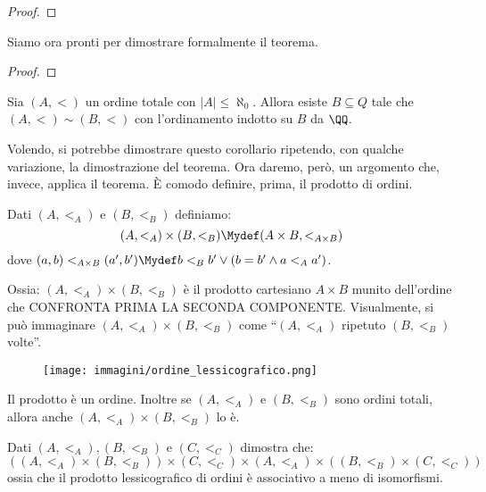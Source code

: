 \documentclass[11pt]{scrartcl}
\begin{document}
\begin{proof}
	
\end{proof}

Siamo ora pronti per dimostrare formalmente il teorema.

\begin{proof}
	
\end{proof}

\begin{corollary}
	Sia $(A,<)$ un ordine totale con $|A| \leq \aleph_0$. Allora esiste $B \subseteq Q$ tale che $(A,<) \sim (B,<)$ con l'ordinamento indotto su $B$ da $\QQ$.
\end{corollary}

\begin{note}
	Volendo, si potrebbe dimostrare questo corollario ripetendo, con qualche variazione, la dimostrazione del teorema. Ora daremo, però,
	un argomento che, invece, applica il teorema. È comodo definire, prima, il prodotto di ordini.
\end{note}

\begin{definition}
	Dati $(A,<_A)$ e $(B,<_B)$ definiamo:
	\[ (A,<_A) \times (B,<_B) \Mydef (A \times B, <_{A \times B})
 		\]
	dove $(a,b) <_{A \times B} (a',b') \Mydef b <_B b' \lor (b = b' \land a <_A a')$.
\end{definition}

Ossia: $(A,<_A) \times (B,<_B)$ è il prodotto cartesiano $A \times B$ munito dell'ordine che CONFRONTA PRIMA LA SECONDA COMPONENTE.
Visualmente, si può immaginare $(A,<_A) \times (B,<_B)$ come ``$(A,<_A)$ ripetuto $(B,<_B)$ volte''.

\begin{figure}[h]
	\centering
	\texttt{[image: immagini/ordine\_lessicografico.png]}
\end{figure}

\begin{remark}
	Il prodotto è un ordine. Inoltre se $(A, <_A)$ e $(B,<_B)$ sono ordini totali, allora anche 
	$(A,<_A) \times (B,<_B)$ lo è.
\end{remark}

\begin{exercise}
	Dati $(A,<_A),(B,<_B)$ e $(C,<_C)$ dimostra che:
	\[ ((A,<_A) \times (B,<_B)) \times (C,<_C) \times (A,<_A) \times ((B,<_B) \times (C,<_C))
		\]
	ossia che il prodotto lessicografico di ordini è associativo a meno di isomorfismi.
\end{exercise}
\end{document}
